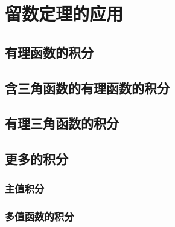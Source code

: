 \section{留数定理的应用}
    \subsection{有理函数的积分}
    \subsection{含三角函数的有理函数的积分}
    \subsection{有理三角函数的积分}
    \subsection{更多的积分}
        \subsubsection{主值积分}
        \subsubsection{多值函数的积分}
